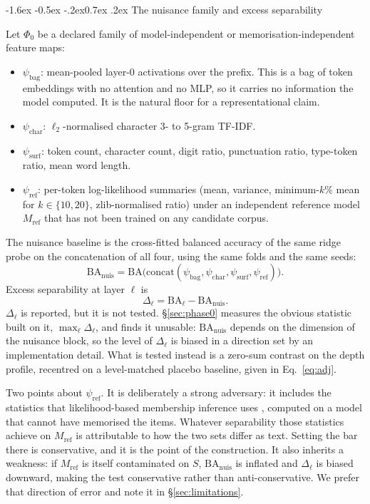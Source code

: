 \documentclass[10pt,twocolumn,letterpaper]{article}
\makeatletter
\renewcommand\subsection{\@startsection{subsection}{2}{\z@}%
  {-1.6ex \@plus -0.5ex \@minus -.2ex}{0.7ex \@plus .2ex}%
  {\normalfont\normalsize\bfseries}}
\newcommand{\BA}{\mathrm{BA}}
\newcommand{\nuis}{\mathrm{nuis}}
\makeatother
\begin{document}
\subsection{The nuisance family and excess separability}
\label{sec:nuisance}

Let $\Phi_0$ be a declared family of model-independent or memorisation-independent feature maps:
\begin{itemize}\itemsep1pt
\item $\psi_{\mathrm{bag}}$: mean-pooled layer-0 activations over the prefix. This is a bag of token embeddings with no attention and no MLP, so it carries no information the model computed. It is the natural floor for a representational claim.
\item $\psi_{\mathrm{char}}$: $\ell_2$-normalised character 3- to 5-gram TF-IDF.
\item $\psi_{\mathrm{surf}}$: token count, character count, digit ratio, punctuation ratio, type-token ratio, mean word length.
\item $\psi_{\mathrm{ref}}$: per-token log-likelihood summaries (mean, variance, minimum-$k$\% mean for $k\in\{10,20\}$, zlib-normalised ratio) under an independent reference model $M_{\mathrm{ref}}$ that has not been trained on any candidate corpus.
\end{itemize}

The nuisance baseline is the cross-fitted balanced accuracy of the same ridge probe on the concatenation of all four, using the same folds and the same seeds:
\begin{equation}
\BA_{\nuis} = \BA\big(\text{concat}(\psi_{\mathrm{bag}},\psi_{\mathrm{char}},\psi_{\mathrm{surf}},\psi_{\mathrm{ref}})\big).
\end{equation}
Excess separability at layer $\ell$ is
\begin{equation}
\Delta_\ell = \BA_\ell - \BA_{\nuis} .
\label{eq:delta}
\end{equation}
$\Delta_\ell$ is reported, but it is not tested. \S\ref{sec:phase0} measures the obvious statistic built on it, $\max_\ell \Delta_\ell$, and finds it unusable: $\BA_{\nuis}$ depends on the dimension of the nuisance block, so the level of $\Delta_\ell$ is biased in a direction set by an implementation detail. What is tested instead is a zero-sum contrast on the depth profile, recentred on a level-matched placebo baseline, given in Eq.~\eqref{eq:adj}.

Two points about $\psi_{\mathrm{ref}}$. It is deliberately a strong adversary: it includes the statistics that likelihood-based membership inference uses \cite{shi2024minkprob}, computed on a model that cannot have memorised the items. Whatever separability those statistics achieve on $M_{\mathrm{ref}}$ is attributable to how the two sets differ as text. Setting the bar there is conservative, and it is the point of the construction. It also inherits a weakness: if $M_{\mathrm{ref}}$ is itself contaminated on $S$, $\BA_{\nuis}$ is inflated and $\Delta_\ell$ is biased downward, making the test conservative rather than anti-conservative. We prefer that direction of error and note it in \S\ref{sec:limitations}.
\end{document}
